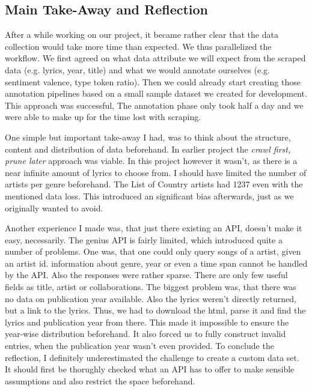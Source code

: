 \documentclass[11pt,a4paper]{article}
\begin{document}
\subsection{Main Take-Away and Reflection}\label{sec:takeaway}

After a while working on our project, it became rather clear that the data collection would take more time than expected. We thus parallelized the workflow. We first agreed on what data attribute we will expect from the scraped data (e.g. lyrics, year, title) and what we would annotate ourselves (e.g. sentiment valence, type token ratio). Then we could already start creating those annotation pipelines based on a small sample dataset we created for development. This approach was successful, The annotation phase only took half a day and we were able to make up for the time lost with scraping.  

One simple but important take-away I had, was to think about the structure, content and distribution of data beforehand. In earlier project the \emph{crawl first, prune later} approach was viable. In this project however it wasn't, as there is a near infinite amount of lyrics to choose from. I should have limited the number of artists per genre beforehand. The List of Country artists had 1237 even with the mentioned data loss. This introduced an significant bias afterwards, just as we originally wanted to avoid. 

Another experience I made was, that just there existing an API, doesn't make it easy, necessarily. The genius API is fairly limited, which introduced quite a number of problems. One was, that one could only query songs of a artist, given an artist id. information about genre, year or even a time span cannot be handled by the API. 
Also the responses were rather sparse. There are only few useful fields as title, artist or collaborations. The biggest problem was, that there was no data on publication year available. Also the lyrics weren't directly returned, but a link to the lyrics. Thus, we had to download the html, parse it and find the lyrics and publication year from there. 
This made it impossible to ensure the year-wise distribution beforehand. It also forced us to fully construct invalid entries, when the publication year wasn't even provided. 
To conclude the reflection, I definitely underestimated the challenge to create a custom data set. It should first be thorughly checked what an API has to offer to make sensible assumptions and also restrict the space beforehand.
\end{document}

